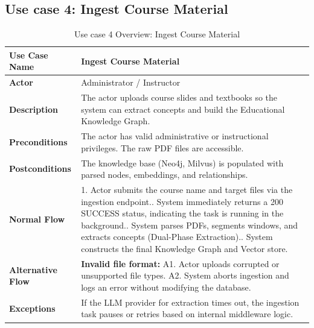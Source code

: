 \subsection{Use case 4: Ingest Course Material}
\begin{table}[H]
    \centering
    \renewcommand{\arraystretch}{1.5}
    \begin{tabularx}{\textwidth}{|l|X|}
        \hline
        \textbf{Use Case Name} & Ingest Course Material \\
        \hline
        \textbf{Actor} & Administrator / Instructor \\
        \hline
        \textbf{Description} & The actor uploads course slides and textbooks so the system can extract concepts and build the Educational Knowledge Graph. \\
        \hline
        \textbf{Preconditions} & The actor has valid administrative or instructional privileges.\newline
        The raw PDF files are accessible. \\
        \hline
        \textbf{Postconditions} & The knowledge base (Neo4j, Milvus) is populated with parsed nodes, embeddings, and relationships. \\
        \hline
        \textbf{Normal Flow} & 
        1. Actor submits the course name and target files via the ingestion endpoint.\newline
        2. System immediately returns a 200 SUCCESS status, indicating the task is running in the background.\newline
        3. System parses PDFs, segments windows, and extracts concepts (Dual-Phase Extraction).\newline
        4. System constructs the final Knowledge Graph and Vector store. \\
        \hline
        \textbf{Alternative Flow} & 
        \textbf{Invalid file format:}\newline
        A1. Actor uploads corrupted or unsupported file types.\newline
        A2. System aborts ingestion and logs an error without modifying the database. \\
        \hline
        \textbf{Exceptions} & If the LLM provider for extraction times out, the ingestion task pauses or retries based on internal middleware logic. \\
        \hline
    \end{tabularx}
    \caption{Use case 4 Overview: Ingest Course Material}\label{tab:uc4}
\end{table}


